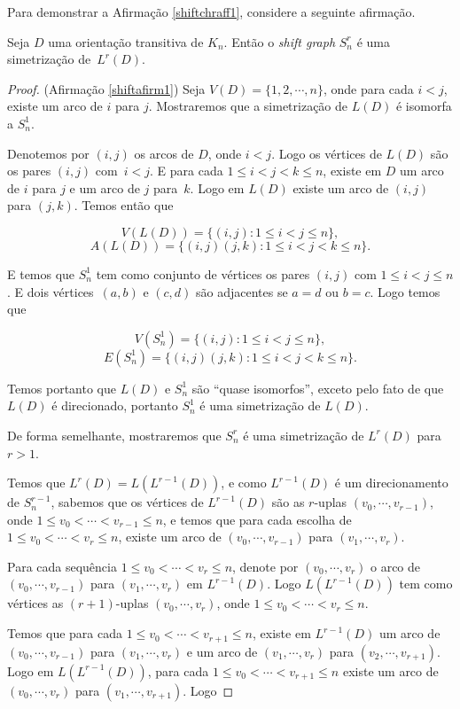 Para demonstrar a Afirmação \ref{shiftchraff1}, considere a seguinte afirmação.

\begin{afirmacao}\label{shiftafirm1}
Seja $D$ uma orientação transitiva de $K_n$. Então o \textit{shift graph} $S_n^r$ é uma simetrização de~$L^r(D)$.
\end{afirmacao}

\begin{proof}(Afirmação \ref{shiftafirm1})
Seja $V(D) = \{1,2,\cdots, n\}$, onde para cada $i < j$, existe um arco de $i$ para $j$. Mostraremos que a simetrização de $L(D)$ é isomorfa a $S_n^1$.

Denotemos por $(i,j)$ os arcos de $D$, onde $i < j$. Logo os vértices de $L(D)$ são os pares $(i,j)$ com~$i < j$. E para cada $1 \leq i < j < k \leq n$, existe em $D$ um arco de $i$ para $j$ e um arco de $j$ para~$k$. Logo em $L(D)$ existe um arco de $(i,j)$ para $(j,k)$. Temos então que

\[V(L(D)) = \{(i,j) : 1\leq i < j \leq n\},\]
\[A(L(D)) = \{(i,j)(j,k) : 1\leq i <j<k\leq n\}.\]

E temos que $S_n^1$ tem como conjunto de vértices os pares $(i,j)$ com $1\leq i<j\leq n$. E dois vértices~$(a,b)$ e $(c,d)$ são adjacentes se $a = d$ ou $b = c$. Logo temos que

\[V(S_n^1) = \{(i,j) : 1\leq i<j\leq n\},\]
\[E(S_n^1) = \{(i,j)(j,k) : 1\leq i<j<k\leq n\}.\]

Temos portanto que $L(D)$ e $S_n^1$ são ``quase isomorfos'', exceto pelo fato de que $L(D)$ é direcionado, portanto $S_n^1$ é uma simetrização de $L(D)$.

De forma semelhante, mostraremos que $S_n^r$ é uma simetrização de $L^r(D)$ para $r>1$.

Temos que $L^r(D) = L(L^{r-1}(D))$, e como $L^{r-1}(D)$ é um direcionamento de $S_n^{r-1}$, sabemos que os vértices de $L^{r-1}(D)$ são as $r$-uplas $(v_0,\cdots,v_{r-1})$, onde $1\leq v_0 < \cdots < v_{r-1} \leq n$, e temos que para cada escolha de $1\leq v_0 < \cdots < v_{r} \leq n$, existe um arco de $(v_0,\cdots,v_{r-1})$ para $(v_1,\cdots,v_r)$.

Para cada sequência $1\leq v_0 < \cdots < v_{r} \leq n$, denote por $(v_0,\cdots,v_{r})$ o arco de $(v_0,\cdots,v_{r-1})$ para $(v_1,\cdots,v_r)$ em $L^{r-1}(D)$. Logo $L(L^{r-1}(D))$ tem como vértices as $(r+1)$-uplas $(v_0,\cdots,v_{r})$, onde $1\leq v_0 < \cdots < v_r \leq n$.

Temos que para cada $1\leq v_0 < \cdots < v_{r+1} \leq n$, existe em $L^{r-1}(D)$ um arco de $(v_0,\cdots,v_{r-1})$ para $(v_1,\cdots,v_r)$ e um arco de $(v_1,\cdots,v_{r})$ para $(v_2,\cdots,v_{r+1})$. Logo em $L(L^{r-1}(D))$, para cada $1\leq v_0 < \cdots < v_{r+1} \leq n$ existe um arco de $(v_0,\cdots,v_{r})$ para $(v_1,\cdots,v_{r+1})$. Logo


\end{proof}
